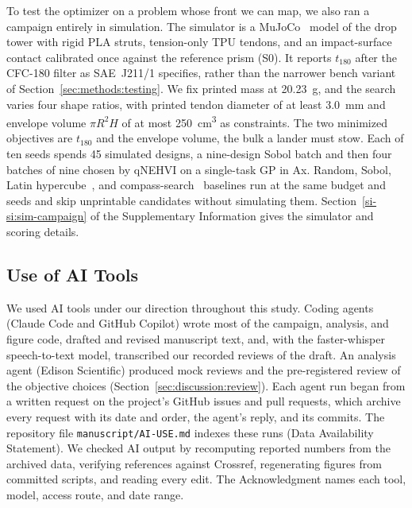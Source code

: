 \documentclass[lineno,nocopyright,upint,varvw,hyphenate]{asmejour}
\newcommand{\siref}[1]{\ref*{si-#1}}
\begin{document}
To test the optimizer on a problem whose front we can map, we
also ran a campaign entirely in simulation. The simulator is a
MuJoCo~\citep{todorov2012mujoco} model of the drop tower with rigid
PLA struts, tension-only TPU tendons, and an impact-surface contact
calibrated once against the reference prism (S0). It reports $t_{180}$
after the CFC-180 filter as SAE~J211/1 specifies, rather than the
narrower bench variant of Section~\ref{sec:methods:testing}. We fix
printed mass at \SI{20.23}{g},
and the search varies four shape ratios, with printed tendon diameter
of at least \SI{3.0}{mm} and envelope volume $\pi R^2 H$ of at most
\SI{250}{cm^3} as constraints. The two minimized objectives are
$t_{180}$ and the envelope volume, the bulk a lander must stow. Each of
ten seeds spends 45 simulated designs, a nine-design Sobol batch and
then four batches of nine chosen by qNEHVI on a single-task GP in Ax.
Random, Sobol, Latin hypercube~\citep{mckay1979lhs}, and
compass-search~\citep{kolda2003directsearch} baselines run at the same
budget and seeds and skip unprintable candidates without simulating
them. Section~\siref{si:sim-campaign} of the Supplementary
Information gives the simulator and scoring details.

\subsection{Use of AI Tools}
\label{sec:methods:ai}

We used AI tools under our direction throughout this study. Coding
agents (Claude Code and GitHub Copilot) wrote most of the campaign,
analysis, and figure code, drafted and revised manuscript text, and,
with the faster-whisper speech-to-text model, transcribed our recorded
reviews of the draft. An analysis agent (Edison Scientific) produced
mock reviews and the pre-registered review of the objective choices
(Section~\ref{sec:discussion:review}). Each agent run began from a
written request on the project's GitHub issues and pull requests, which
archive every request with its date and order, the agent's reply, and
its commits. The repository file \texttt{manuscript/AI-USE.md} indexes
these runs (Data Availability Statement). We checked AI output by recomputing reported numbers from
the archived data, verifying references against Crossref, regenerating
figures from committed scripts, and reading every edit. The
Acknowledgment names each tool, model, access route, and date range.%
\end{document}
